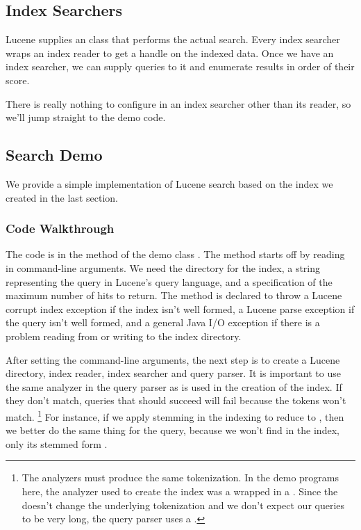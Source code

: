 \subsection{Index Searchers}

Lucene supplies an  class that performs the actual
search.  Every index searcher wraps an index reader to get a handle
on the indexed data.  Once we have an index searcher, we can supply
queries to it and enumerate results in order of their score.

There is really nothing to configure in an index searcher other
than its reader, so we'll jump straight to the demo code.

\subsection{Search Demo}\label{section:lucene-search}

We provide a simple implementation of Lucene search based on the index
we created in the last section.  

\subsubsection{Code Walkthrough}

The code is in the  method of the demo class
.  The method starts off by reading in command-line
arguments.
%
%
We need the directory for the index, a string representing the query
in Lucene's query language, and a specification of the maximum number
of hits to return.  The method is declared to throw a Lucene corrupt
index exception if the index isn't well formed, a Lucene parse
exception if the query isn't well formed, and a general Java I/O
exception if there is a problem reading from or writing to the index
directory.

After setting the command-line arguments, the next step is to
create a Lucene directory, index reader, index searcher and
query parser.
%
%
It is important to use the same analyzer in the query parser as is
used in the creation of the index.  If they don't match, queries that
should succeed will fail because the tokens won't match.%
%
\footnote{The analyzers must produce the same tokenization.
 In the demo programs here, the analyzer used to create the index
 was a  wrapped  in a 
 .
 Since the  doesn't change the underlying
 tokenization and we don't expect our queries to be very long,
 the query parser uses a .}
%
For instance, if we apply stemming in the indexing to reduce
 to , then we better do the
same thing for the query, because we won't find 
in the index, only its stemmed form .

